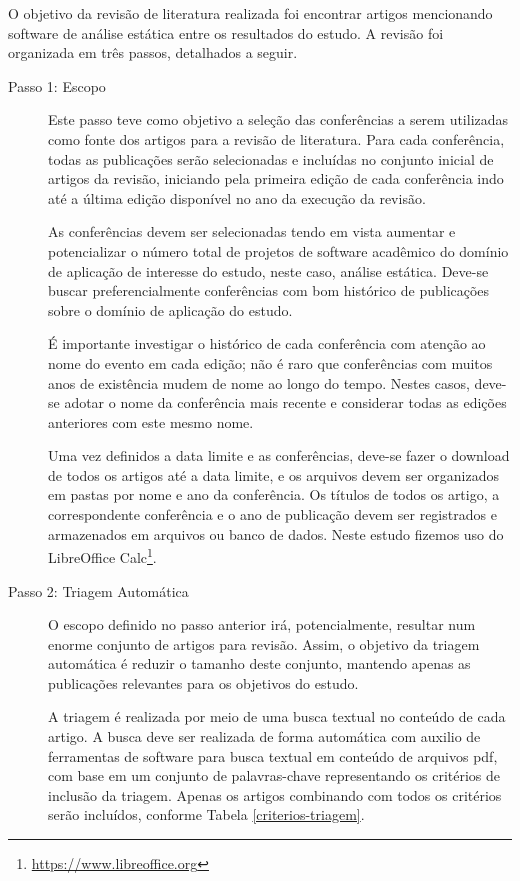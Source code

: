 O objetivo da revisão de literatura realizada foi encontrar artigos mencionando
software de análise estática entre os resultados do estudo. A revisão foi
organizada em três passos, detalhados a seguir.

\begin{description}

  \item [Passo 1: Escopo]

Este passo teve como objetivo a seleção das conferências a serem utilizadas como fonte dos
artigos para a revisão de literatura. 
Para cada conferência, todas as publicações serão selecionadas e
incluídas no conjunto inicial de artigos da revisão, iniciando pela primeira
edição de cada conferência indo até a última edição disponível no ano da execução da revisão.

As conferências devem ser selecionadas tendo em vista aumentar e potencializar
o número total de projetos de software acadêmico do domínio de aplicação de
interesse do estudo, neste caso, análise estática. Deve-se buscar
preferencialmente conferências com bom histórico de publicações sobre o domínio
de aplicação do estudo.

É importante investigar o histórico de cada conferência com atenção ao nome do
evento em cada edição; não é raro que conferências com muitos anos de
existência mudem de nome ao longo do tempo. Nestes casos, deve-se adotar o nome
da conferência mais recente e considerar todas as edições anteriores com este
mesmo nome.

Uma vez definidos a data limite e as conferências, deve-se fazer o download de
todos os artigos até a data limite, e os arquivos devem ser organizados em pastas
por nome e ano da conferência. Os títulos de todos os artigo, a correspondente
conferência e o ano de publicação devem ser registrados e armazenados em
arquivos ou banco de dados. Neste estudo fizemos uso do
LibreOffice Calc\footnote{\url{https://www.libreoffice.org}}.

  \item [Passo 2: Triagem Automática]

O escopo definido no passo anterior irá, potencialmente, resultar num enorme
conjunto de artigos para revisão. Assim, o objetivo da triagem automática é reduzir o tamanho deste
conjunto, mantendo apenas as publicações relevantes para os objetivos do estudo.

A triagem é realizada por meio de uma busca textual no conteúdo de cada artigo. A
busca deve ser realizada de forma automática com auxilio de ferramentas de
software para busca textual em conteúdo de arquivos pdf, com base em um
conjunto de palavras-chave representando os critérios de inclusão da triagem.
Apenas os artigos combinando com todos os critérios serão incluídos, conforme
Tabela \ref{criterios-triagem}.


\end{description}
